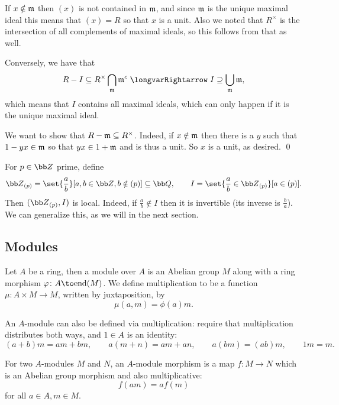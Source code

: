 \eprop

\bproof

    If $x\notin{{\frak m}}$ then $(x)$ is not contained in ${{\frak m}}$, and since ${{\frak m}}$ is the unique maximal ideal this means that $(x)=R$ so that $x$ is a unit.
    Also we noted that $R^\times$ is the intersection of all complements of maximal ideals, so this follows from that as well.

    Conversely, we have that
    $$ R-I \subseteq R^\times \bigcap_\m\m^c \implies I \supseteq \bigcup_\m\m , $$
    which means that $I$ contains all maximal ideals, which can only happen if it is the unique maximal ideal.

    We want to show that $R-{{\frak m}}\subseteq R^\times$.
    Indeed, if $x\notin{{\frak m}}$ then there is a $y$ such that $1-yx\in{{\frak m}}$ so that $yx\in1+{{\frak m}}$ and is thus a unit.
    So $x$ is a unit, as desired.
    \qed

\eproof

\bexam

    For $p\in\bZ$ prime, define
    $$ \bZ_{(p)} = \set{\frac ab}[a,b\in\bZ,b\notin(p)] \subseteq \bQ ,\qquad I = \set{\frac ab\in\bZ_{(p)}}[a\in(p)] . $$
    Then $(\bZ_{(p)},I)$ is local.
    Indeed, if $\frac ab\notin I$ then it is invertible (its inverse is $\frac ba$).
    We can generalize this, as we will in the next section.

\eexam

\subsection{Modules}

\bdefn

    Let $A$ be a ring, then a {\emphcolor module} over $A$ is an Abelian group $M$ along with a ring morphism
    $\phi\colon A\to\endo(M)$.
    We define {\emphcolor multiplication} to be a function $\mu\colon A\times M\to M$, written by juxtaposition, by
    $$ \mu(a,m) = \phi(a)m . $$

\edefn

An $A$-module can also be defined via multiplication: require that multiplication distributes both ways, and $1\in A$ is an identity:
$$ (a+b)m = am + bm,\qquad a(m+n) = am + an,\qquad a(bm) = (ab)m,\qquad 1m = m . $$

\bdefn

    For two $A$-modules $M$ and $N$, an {\emphcolor $A$-module morphism} is a map $f\colon M\to N$ which is an Abelian group morphism and also
    multiplicative:
    $$ f(am) = af(m) $$
    for all $a\in A,m\in M$.

